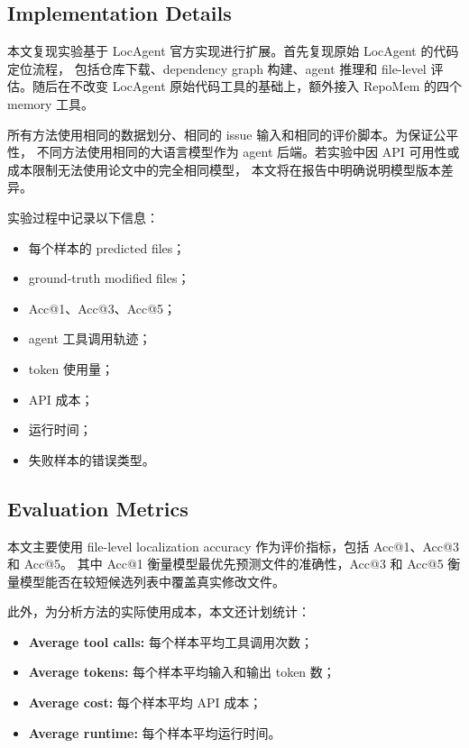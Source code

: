 \subsection{Implementation Details}
\label{subsec:implementation_details}

本文复现实验基于 LocAgent 官方实现进行扩展。首先复现原始 LocAgent 的代码定位流程，
包括仓库下载、dependency graph 构建、agent 推理和 file-level 评估。随后在不改变 LocAgent
原始代码工具的基础上，额外接入 RepoMem 的四个 memory 工具。

所有方法使用相同的数据划分、相同的 issue 输入和相同的评价脚本。为保证公平性，
不同方法使用相同的大语言模型作为 agent 后端。若实验中因 API 可用性或成本限制无法使用论文中的完全相同模型，
本文将在报告中明确说明模型版本差异。

实验过程中记录以下信息：

\begin{itemize}
    \item 每个样本的 predicted files；
    \item ground-truth modified files；
    \item Acc@1、Acc@3、Acc@5；
    \item agent 工具调用轨迹；
    \item token 使用量；
    \item API 成本；
    \item 运行时间；
    \item 失败样本的错误类型。
\end{itemize}

\subsection{Evaluation Metrics}
\label{subsec:evaluation_metrics}

本文主要使用 file-level localization accuracy 作为评价指标，包括 Acc@1、Acc@3 和 Acc@5。
其中 Acc@1 衡量模型最优先预测文件的准确性，Acc@3 和 Acc@5 衡量模型能否在较短候选列表中覆盖真实修改文件。

此外，为分析方法的实际使用成本，本文还计划统计：

\begin{itemize}
    \item \textbf{Average tool calls:} 每个样本平均工具调用次数；
    \item \textbf{Average tokens:} 每个样本平均输入和输出 token 数；
    \item \textbf{Average cost:} 每个样本平均 API 成本；
    \item \textbf{Average runtime:} 每个样本平均运行时间。
\end{itemize}

